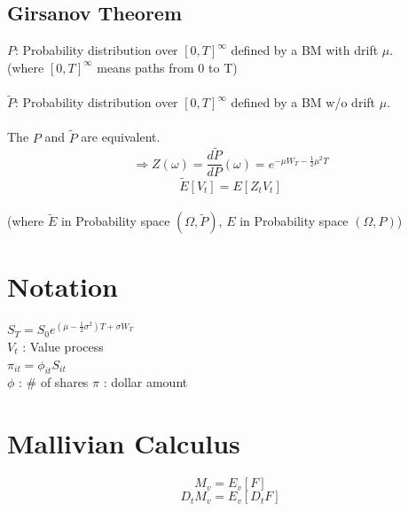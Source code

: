 \documentclass[12pt]{article}
\begin{document}
\subsection{Girsanov Theorem}
$P$: Probability distribution over $[0,T]^{\infty}$ defined by a BM with drift $\mu.$\\
(where $[0,T]^{\infty}$ means paths from 0 to T)\\
\\
$\tilde{P}$: Probability distribution over $[0,T]^{\infty}$ defined by a BM w/o drift $\mu.$\\
\\
The $P$ and $\tilde{P}$ are equivalent.
$$\Rightarrow Z(\omega)=\frac{d\tilde{P}}{dP}(\omega)=e^{-\mu W_T - \frac{1}{2}\mu^2 T}$$
$$\tilde{E}[V_t]=E[Z_t V_t]$$
\\
(where $\tilde{E}$ in Probability space $(\Omega,\tilde{P})$, $E$ in Probability space $(\Omega,P)$)


\section{Notation}
$S_T=S_0 e^{(\mu-\frac{1}{2}\sigma^2)T+\sigma W_T}$\\
$V_t$ : Value process\\
$\pi_{it}=\phi_{it} S_{it}$\\
$\phi$ : \# of shares
$\pi$ : dollar amount

\section{Mallivian Calculus}
$$M_v=E_v[F]$$
$$D_t M_v=E_v[D_tF]$$
\end{document}
